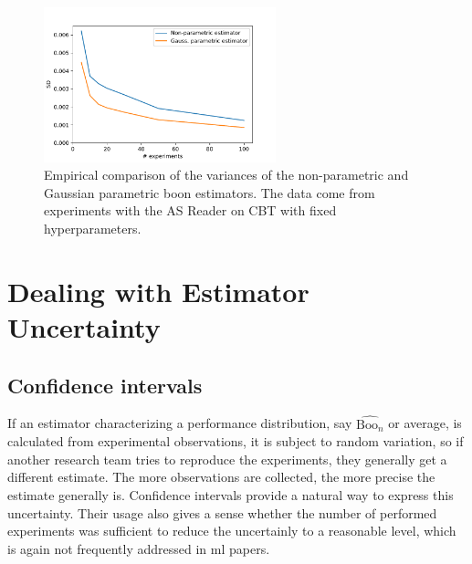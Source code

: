 \documentclass{article}
\newcommand{\ml}{\gls{ml}\xspace}
\newcommand{\boo}[1]{\text{Boo}_{#1}}
\newcommand{\tboon}{\gls{boon}\xspace}
\newcommand{\Em}[1]{\boo{#1}}
\newcommand{\emn}{\Em{n}}
\begin{document}
\begin{appendices}


\begin{figure} [ht]
        \centering
            \centering
            \includegraphics[width=0.6\textwidth]{figures/param_non_param_comparison.pdf}
        \caption[ NA ]{
        Empirical comparison of the variances of the non-parametric and Gaussian parametric \tboon estimators. The data come from experiments with the AS Reader on CBT with fixed hyperparameters.}
        \label{fig:estimator_comparison}
\end{figure}


\section{Dealing with Estimator Uncertainty}

\subsection{Confidence intervals}
\label{}
If an estimator characterizing a performance distribution, say  $\widehat{\emn}$ or average, is calculated from experimental observations, it is subject to random variation, so if another research team tries to reproduce the experiments, they generally get a different estimate. The more observations are collected, the more precise the estimate generally is. Confidence intervals provide a natural way to express this uncertainty. Their usage also gives a sense whether the number of performed experiments was sufficient to reduce the uncertainly to a reasonable level, which is again not frequently addressed in \ml papers. 


\end{appendices}
\end{document}
